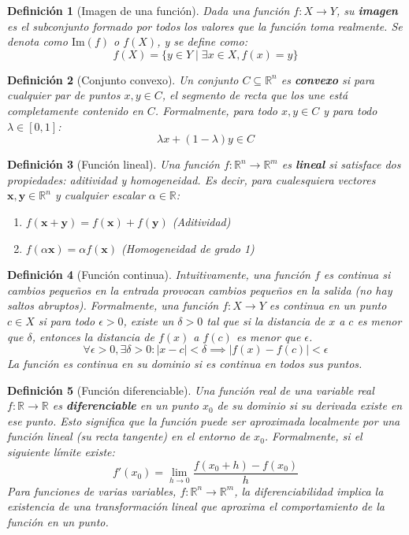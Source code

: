 \documentclass[12pt,a4paper]{book}
\newtheorem{defi}{Definición}[section]
\begin{document}
\begin{defi}[Imagen de una función]
Dada una función $f: X \to Y$, su \textbf{imagen} es el subconjunto formado por todos los valores que la función toma realmente. Se denota como $\text{Im}(f)$ o $f(X)$, y se define como:
$$ f(X) = \{y \in Y \mid \exists x \in X, f(x) = y \} $$
\end{defi}

\begin{defi}[Conjunto convexo]
Un conjunto $C \subseteq \mathbb{R}^n$ es \textbf{convexo} si para cualquier par de puntos $x, y \in C$, el segmento de recta que los une está completamente contenido en $C$. Formalmente, para todo $x, y \in C$ y para todo $\lambda \in [0, 1]$:
$$ \lambda x + (1-\lambda)y \in C $$
\end{defi}

\begin{defi}[Función lineal]
Una función $f: \mathbb{R}^n \to \mathbb{R}^m$ es \textbf{lineal} si satisface dos propiedades: aditividad y homogeneidad. Es decir, para cualesquiera vectores $\mathbf{x}, \mathbf{y} \in \mathbb{R}^n$ y cualquier escalar $\alpha \in \mathbb{R}$:
\begin{enumerate}
    \item $f(\mathbf{x}+\mathbf{y}) = f(\mathbf{x}) + f(\mathbf{y})$ (Aditividad)
    \item $f(\alpha \mathbf{x}) = \alpha f(\mathbf{x})$ (Homogeneidad de grado 1)
\end{enumerate}
\end{defi}

\begin{defi}[Función continua]
Intuitivamente, una función $f$ es continua si cambios pequeños en la entrada provocan cambios pequeños en la salida (no hay saltos abruptos). Formalmente, una función $f: X \to Y$ es continua en un punto $c \in X$ si para todo $\epsilon > 0$, existe un $\delta > 0$ tal que si la distancia de $x$ a $c$ es menor que $\delta$, entonces la distancia de $f(x)$ a $f(c)$ es menor que $\epsilon$.
$$ \forall \epsilon > 0, \exists \delta > 0 : |x-c| < \delta \implies |f(x)-f(c)| < \epsilon $$
La función es continua en su dominio si es continua en todos sus puntos.
\end{defi}

\begin{defi}[Función diferenciable]
Una función real de una variable real $f: \mathbb{R} \to \mathbb{R}$ es \textbf{diferenciable} en un punto $x_0$ de su dominio si su derivada existe en ese punto. Esto significa que la función puede ser aproximada localmente por una función lineal (su recta tangente) en el entorno de $x_0$. Formalmente, si el siguiente límite existe:
$$ f'(x_0) = \lim_{h \to 0} \frac{f(x_0+h) - f(x_0)}{h} $$
Para funciones de varias variables, $f: \mathbb{R}^n \to \mathbb{R}^m$, la diferenciabilidad implica la existencia de una transformación lineal  que aproxima el comportamiento de la función en un punto.
\end{defi}
\end{document}

